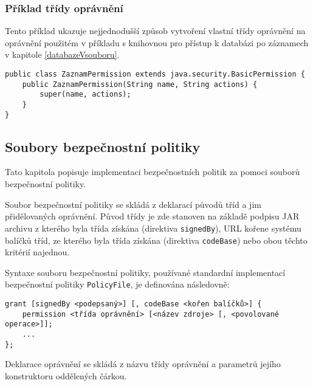 \subsubsection{Příklad třídy oprávnění}

Tento příklad ukazuje nejjednodušší způsob vytvoření vlastní třídy oprávnění na oprávnění použitém v příkladu s knihovnou pro přístup k databázi po záznamech v kapitole \ref{databazeVsouboru}.

\begin{verbatim}
public class ZaznamPermission extends java.security.BasicPermission {
    public ZaznamPermission(String name, String actions) {
        super(name, actions);
    }
}
\end{verbatim}

\subsection{Soubory bezpečnostní politiky}

Tato kapitola popisuje implementaci bezpečnostních politik za pomoci souborů bezpečnostní politiky.

Soubor bezpečnostní politiky se skládá z deklarací původů tříd a jim přidělovaných oprávnění.
Původ třídy je zde stanoven na základě podpisu JAR archivu z kterého byla třída získána (direktiva {\tt signedBy}), URL kořene systému balíčků tříd, ze kterého byla třída získána (direktiva {\tt codeBase}) nebo obou těchto kritérií najednou. \cite[5.3.1]{oaks}

Syntaxe souboru bezpečnostní politiky, používané standardní implementací bezpečnostní politiky {\tt PolicyFile}, je definována následovně: \cite[5.3.1]{oaks}

\begin{verbatim}
grant [signedBy <podepsaný>] [, codeBase <kořen balíčků>] {
    permission <třída oprávnění> [<název zdroje> [, <povolované operace>]];
    ...
};
\end{verbatim}

Deklarace oprávnění se skládá z názvu třídy oprávnění a parametrů jejího konstruktoru oddělených čárkou.


